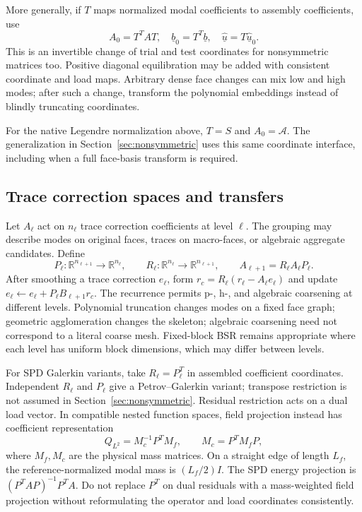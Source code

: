 \documentclass[11pt]{article}
\numberwithin{equation}{section}
\numberwithin{figure}{section}
\numberwithin{table}{section}
\begin{document}
More generally, if $T$ maps normalized modal coefficients to assembly
coefficients, use
\[
 A_0=T^TAT,\quad \underline{b}_0=T^T\underline{b},
 \quad\underline{\widehat{u}}
       =T\underline{\widehat{u}}_0.
\]
This is an invertible change of trial and test coordinates for nonsymmetric
matrices too. Positive diagonal equilibration may be added with consistent
coordinate and load maps.
Arbitrary dense face changes can mix low and high modes; after such a change,
transform the polynomial embeddings instead of blindly truncating coordinates.

For the native Legendre normalization above, $T=S$ and $A_0=\mathcal A$.
The generalization in Section~\ref{sec:nonsymmetric} uses this same coordinate
interface, including when a full face-basis transform is required.

\subsection{Trace correction spaces and transfers}\label{sec:hierarchy}
Let $A_\ell$ act on $n_\ell$ trace correction coefficients at level $\ell$.
The grouping may describe modes on original faces, traces on macro-faces,
or algebraic aggregate candidates. Define
\[
 P_\ell:\mathbb R^{n_{\ell+1}}\longrightarrow\mathbb R^{n_\ell},\qquad
 R_\ell:\mathbb R^{n_\ell}\longrightarrow\mathbb R^{n_{\ell+1}},\qquad
 A_{\ell+1}=R_\ell A_\ell P_\ell.
\]
After smoothing a trace correction $e_\ell$, form
$r_c=R_\ell(r_\ell-A_\ell e_\ell)$ and update
$e_\ell\leftarrow e_\ell+P_\ell B_{\ell+1}r_c$.
The recurrence permits p-, h-, and algebraic coarsening at different levels.
Polynomial truncation changes modes on a fixed face graph; geometric
agglomeration changes the skeleton; algebraic coarsening need not correspond
to a literal coarse mesh. Fixed-block BSR remains appropriate where each
level has uniform block dimensions, which may differ between levels.

For SPD Galerkin variants, take $R_\ell=P_\ell^T$ in assembled coefficient
coordinates. Independent $R_\ell$ and $P_\ell$ give a Petrov--Galerkin variant;
transpose restriction is not assumed in Section~\ref{sec:nonsymmetric}.
Residual restriction acts on a dual load vector. In compatible nested
function spaces, field projection instead has coefficient representation
\[
 Q_{L^2}=M_c^{-1}P^TM_f,\qquad M_c=P^TM_fP,
\]
where $M_f,M_c$ are the physical mass matrices. On a straight edge of length
$L_f$, the reference-normalized modal mass is $(L_f/2)I$.
The SPD energy projection is $(P^TAP)^{-1}P^TA$.
Do not replace $P^T$ on dual residuals with a mass-weighted field projection
without reformulating the operator and load coordinates consistently.
\end{document}
